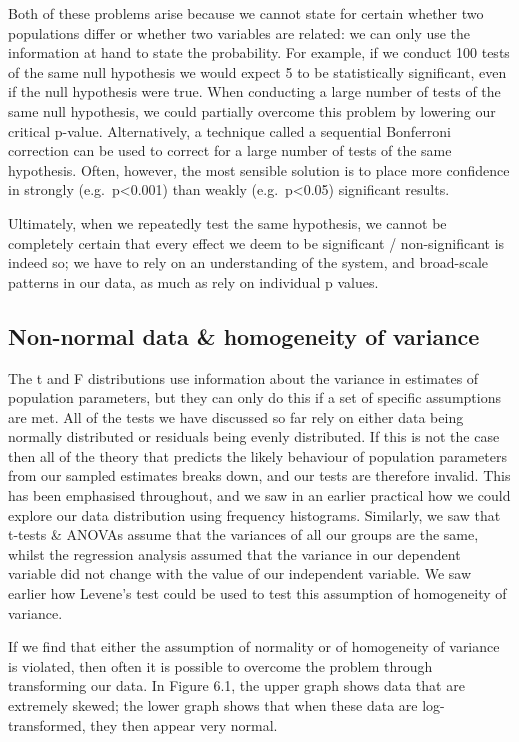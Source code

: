 \documentclass[
]{book}
\begin{document}
Both of these problems arise because we cannot state for certain whether two populations differ or whether two variables are related: we can only use the information at hand to state the probability. For example, if we conduct 100 tests of the same null hypothesis we would expect 5 to be statistically significant, even if the null hypothesis were true. When conducting a large number of tests of the same null hypothesis, we could partially overcome this problem by lowering our critical p-value. Alternatively, a technique called a sequential Bonferroni correction can be used to correct for a large number of tests of the same hypothesis. Often, however, the most sensible solution is to place more confidence in strongly (e.g.~p\textless0.001) than weakly (e.g.~p\textless0.05) significant results.

Ultimately, when we repeatedly test the same hypothesis, we cannot be completely certain that every effect we deem to be significant / non-significant is indeed so; we have to rely on an understanding of the system, and broad-scale patterns in our data, as much as rely on individual p values.

\subsection*{Non-normal data \& homogeneity of variance}\label{non-normal-data-homogeneity-of-variance}

The t and F distributions use information about the variance in estimates of population parameters, but they can only do this if a set of specific assumptions are met. All of the tests we have discussed so far rely on either data being normally distributed or residuals being evenly distributed. If this is not the case then all of the theory that predicts the likely behaviour of population parameters from our sampled estimates breaks down, and our tests are therefore invalid. This has been emphasised throughout, and we saw in an earlier practical how we could explore our data distribution using frequency histograms. Similarly, we saw that t-tests \& ANOVAs assume that the variances of all our groups are the same, whilst the regression analysis assumed that the variance in our dependent variable did not change with the value of our independent variable. We saw earlier how Levene's test could be used to test this assumption of homogeneity of variance.

If we find that either the assumption of normality or of homogeneity of variance is violated, then often it is possible to overcome the problem through transforming our data. In Figure 6.1, the upper graph shows data that are extremely skewed; the lower graph shows that when these data are log- transformed, they then appear very normal.
\end{document}
